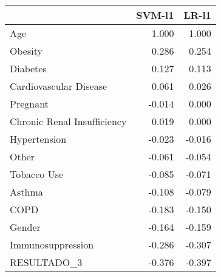 \begin{tabular}{lrr}
\toprule
{} &  SVM-l1 &  LR-l1 \\
\midrule
Age                         &   1.000 &  1.000 \\
Obesity                     &   0.286 &  0.254 \\
Diabetes                    &   0.127 &  0.113 \\
Cardiovascular Disease      &   0.061 &  0.026 \\
Pregnant                    &  -0.014 &  0.000 \\
Chronic Renal Insufficiency &   0.019 &  0.000 \\
Hypertension                &  -0.023 & -0.016 \\
Other                       &  -0.061 & -0.054 \\
Tobacco Use                 &  -0.085 & -0.071 \\
Asthma                      &  -0.108 & -0.079 \\
COPD                        &  -0.183 & -0.150 \\
Gender                      &  -0.164 & -0.159 \\
Immunosuppression           &  -0.286 & -0.307 \\
RESULTADO\_3                 &  -0.376 & -0.397 \\
\bottomrule
\end{tabular}
